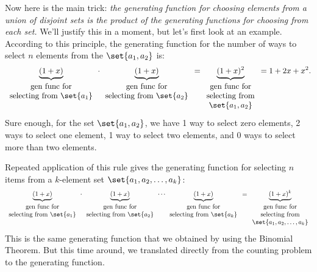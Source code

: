 Now here is the main trick: \emph{the generating function for choosing
  elements from a union of disjoint sets is the product of the
  generating functions for choosing from each set.}  We'll justify
this in a moment, but let's first look at an example.  According to
this principle, the generating function for the number of ways to
select $n$ elements from the $\set{a_1, a_2}$ is:
%
\[
\underbrace{(1 + x)}_{
\begin{array}{cc}
\text{gen func for} \\
\text{selecting from $\set{a_1}$}
\end{array}}
\cdot
\underbrace{(1 + x)}_{
\begin{array}{cc}
\text{gen func for} \\
\text{selecting from $\set{a_2}$}
\end{array}}
=
\underbrace{(1 + x)^2}_{
\begin{array}{cc}
\text{gen func for} \\
\text{selecting from} \\
\set{a_1, a_2}
\end{array}}
= 1 + 2x + x^2.
\]
%
Sure enough, for the set $\set{a_1, a_2}$, we have 1 way to select
zero elements, 2 ways to select one element, 1 way to select two
elements, and 0 ways to select more than two elements.

Repeated application of this rule gives the generating function for
selecting $n$ items from a $k$-element set $\set{a_1, a_2, \dots,
a_k}$:
%
\[
\underbrace{(1 + x)}_{
\begin{array}{cc}
\mbox{gen func for} \\
\text{selecting from $\set{a_1}$}
\end{array}}
\cdot
\underbrace{(1 + x)}_{
\begin{array}{cc}
\mbox{gen func for} \\
\text{selecting from $\set{a_2}$}
\end{array}}
\cdots
\underbrace{(1 + x)}_{
\begin{array}{cc}
\mbox{gen func for} \\
\text{selecting from $\set{a_k}$}
\end{array}}
=
\underbrace{(1 + x)^k}_{
\begin{array}{cc}
\mbox{gen func for} \\
\text{selecting from} \\
\set{a_1, a_2, \dots, a_k}
\end{array}}
\]
%
This is the same generating function that we obtained by using the
Binomial Theorem.  But this time around, we translated directly from
the counting problem to the generating function.

